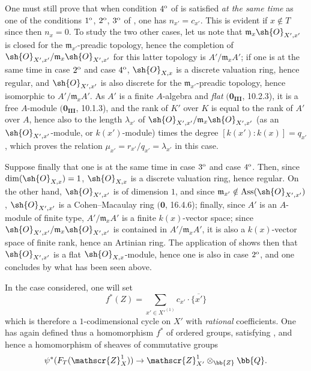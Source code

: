 \begin{env}[21.10.11]
\label{IV.21.10.11}
One must still prove that when condition $4\textsuperscript{o}$ of  is satisfied \emph{at the same time} as one of the conditions $1\textsuperscript{o}$, $2\textsuperscript{o}$, $3\textsuperscript{o}$ of , one has $n_{x'}=c_{x'}$.
This is evident if $x\notin T$ since then $n_x=0$.
To study the two other cases, let us note that $\mathfrak{m}_x\sh{O}_{X',x'}$ is closed for the $\mathfrak{m}_{x'}$-preadic topology, hence the completion of $\sh{O}_{X',x'}/\mathfrak{m}_x\sh{O}_{X',x'}$ for this latter topology is $A'/\mathfrak{m}_x A'$;
if one is at the same time in case $2\textsuperscript{o}$ and case $4\textsuperscript{o}$, $\sh{O}_{X,x}$ is a discrete valuation ring, hence regular, and $\sh{O}_{X',x'}$ is also discrete for the $\mathfrak{m}_{x'}$-preadic topology, hence isomorphic to $A'/\mathfrak{m}_x A'$.
As $A'$ is a finite $A$-algebra and \emph{flat} $(\mathbf{0_{III}}$, 10.2.3), it is a free $A$-module $(\mathbf{0_{III}}$, 10.1.3), and the rank of $K'$ over $K$ is equal to the rank of $A'$ over $A$, hence also to the length $\lambda_{x'}$ of $\sh{O}_{X',x'}/\mathfrak{m}_x\sh{O}_{X',x'}$ (as an $\sh{O}_{X',x'}$-module, or $k(x')$-module) times the degree $[k(x'):k(x)]=q_{x'}$, which proves the relation $\mu_{x'}=r_{x'}/q_{x'}=\lambda_{x'}$ in this case.

Suppose finally that one is at the same time in case $3\textsuperscript{o}$ and case $4\textsuperscript{o}$.
Then, since $\dim(\sh{O}_{X,x})=1$, $\sh{O}_{X,x}$ is a discrete valuation ring, hence regular.
On the other hand, $\sh{O}_{X',x'}$ is of dimension $1$, and since $\mathfrak{m}_{x'}\notin\operatorname{Ass}(\sh{O}_{X',x'})$, $\sh{O}_{X',x'}$ is a Cohen--Macaulay ring $(\mathbf{0}$, 16.4.6);
finally, since $A'$ is an $A$-module of finite type, $A'/\mathfrak{m}_x A'$ is a finite $k(x)$-vector space;
since $\sh{O}_{X',x'}/\mathfrak{m}_x\sh{O}_{X',x'}$ is contained in $A'/\mathfrak{m}_x A'$, it is also a $k(x)$-vector space of finite rank, hence an Artinian ring.
The application of  shows then that $\sh{O}_{X',x'}$ is a flat $\sh{O}_{X,x}$-module, hence one is also in case $2\textsuperscript{o}$, and one concludes by what has been seen above.

In the case considered, one will set
\[
  f^*(Z)=\sum_{x'\in X'^{(1)}}c_{x'}\cdot\overline{\{x'\}}
\]
which is therefore a $1$-codimensional cycle on $X'$ with \emph{rational} coefficients.
One has again defined thus a homomorphism $f^*$ of ordered groups, satisfying , and hence a homomorphism of sheaves of commutative groups
\[
  \psi^*(F_T(\mathscr{Z}_X^1))\to\mathscr{Z}_{X'}^1\otimes_{\bb{Z}}\bb{Q}.
\]


\end{env}
